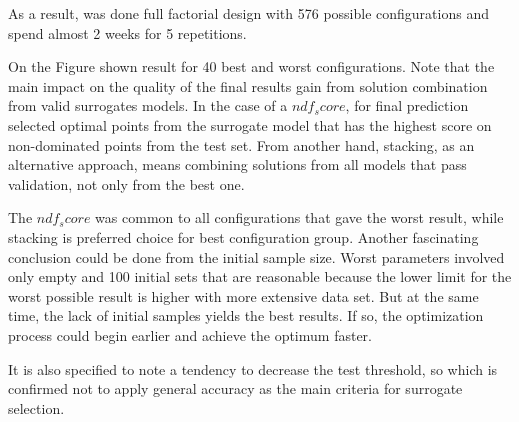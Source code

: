     As a result, was done full factorial design with 576 possible configurations and spend almost 2 weeks for 5 repetitions.

    On the Figure shown result for 40 best and worst configurations. Note that the main impact on the quality of the final results gain from solution combination from valid surrogates models. In the case of a $ndf_score$, for final prediction selected optimal points from the surrogate model that has the highest score on non-dominated points from the test set. From another hand, stacking, as an alternative approach, means combining solutions from all models that pass validation, not only from the best one.

    The $ndf_score$  was common to all configurations that gave the worst result, while stacking is preferred choice for best configuration group. Another fascinating conclusion could be done from the initial sample size. Worst parameters involved only empty and 100 initial sets that are reasonable because the lower limit for the worst possible result is higher with more extensive data set. But at the same time, the lack of initial samples yields the best results. If so, the optimization process could begin earlier and achieve the optimum faster. 

    It is also specified to note a tendency to decrease the test threshold, so which is confirmed not to apply general accuracy as the main criteria for surrogate selection.

